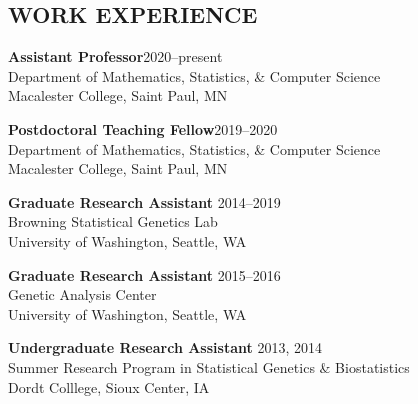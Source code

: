 \documentclass[margin]{res}
\begin{document}
\begin{resume}
\section{WORK EXPERIENCE}

\textbf{Assistant Professor}\hfill 2020--present \\
Department of Mathematics, Statistics, \& Computer Science \\
Macalester College, Saint Paul, MN

\textbf{Postdoctoral Teaching Fellow}\hfill 2019--2020 \\
Department of Mathematics, Statistics, \& Computer Science \\
Macalester College, Saint Paul, MN

\textbf{Graduate Research Assistant} \hfill 2014--2019\\
Browning Statistical Genetics Lab \\
University of Washington, Seattle, WA
	
\textbf{Graduate Research Assistant} \hfill 2015--2016 \\
Genetic Analysis Center \\
University of Washington, Seattle, WA
	

\textbf{Undergraduate Research Assistant} \hfill 2013, 2014 \\
Summer Research Program in Statistical Genetics \& Biostatistics \\
Dordt Colllege, Sioux Center, IA


\end{resume}
\end{document}
